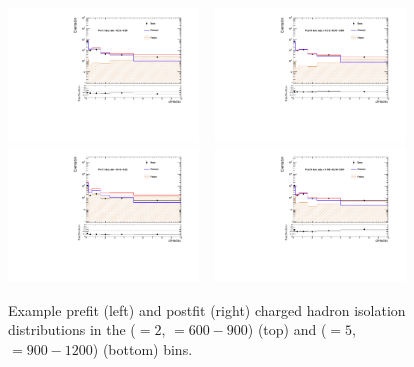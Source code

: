\begin{figure}[h!]
  \centering
  \includegraphics[width=0.45\textwidth]{figures/photonpurity/fakeFit_eq2j_600_prefit} ~
  \includegraphics[width=0.45\textwidth]{figures/photonpurity/fakeFit_eq2j_600_postfit} \\
  \includegraphics[width=0.45\textwidth]{figures/photonpurity/fakeFit_ge5j_900_prefit} ~
  \includegraphics[width=0.45\textwidth]{figures/photonpurity/fakeFit_ge5j_900_postfit}
  \caption{\label{fig:photonTemplateFits} 
  Example prefit (left) and postfit (right) charged hadron isolation
  distributions in the (\njet$=2$, \HT$=600-900$) (top) and 
  (\njet$=5$, \HT$=900-1200$) (bottom) bins.}
\end{figure}



